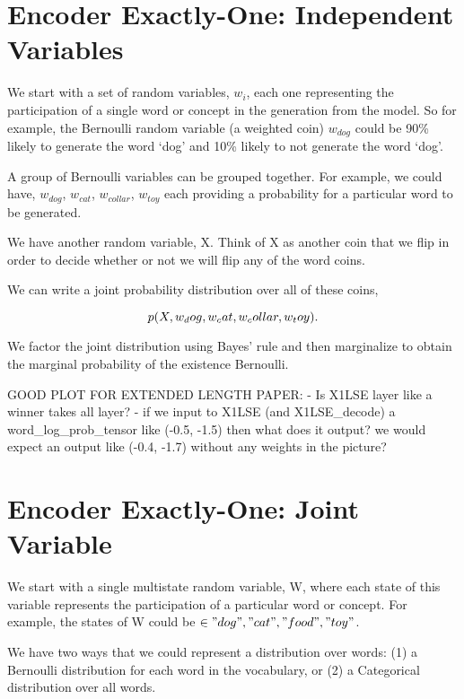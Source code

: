 \section{Encoder Exactly-One: Independent Variables}

We start with a set of random variables, $w_i$, each one representing the participation of a single word or concept in the generation from the model.  So for example, the Bernoulli random variable (a weighted coin) $w_{dog}$ could be 90\% likely to generate the word `dog' and 10\% likely to not generate the word `dog'.

A group of Bernoulli variables can be grouped together.  For example, we could have, $w_{dog}$, $w_{cat}$, $w_{collar}$, $w_{toy}$ each providing a probability for a particular word to be generated.

We have another random variable, X. Think of X as another coin that we flip in order to decide whether or not we will flip any of the word coins.

We can write a joint probability distribution over all of these coins,

\begin{equation}
    p(X, w_dog, w_cat, w_collar, w_toy). \\
\end{equation}




We factor the joint distribution using Bayes' rule and then marginalize to obtain the marginal probability of the existence Bernoulli.

GOOD PLOT FOR EXTENDED LENGTH PAPER:
- Is X1LSE layer like a winner takes all layer?  - if we input to X1LSE (and X1LSE_decode) a word_log_prob_tensor like (-0.5, -1.5) 
then what does it output?  we would expect an output like (-0.4, -1.7) without any weights in the picture?


\section{Encoder Exactly-One: Joint Variable}

We start with a single multistate random variable, W, where each state of this variable represents the participation of a particular word or concept.  For example, the states of W could be $\in "dog", "cat", "food", "toy"$.


We have two ways that we could represent a distribution over words: (1) a Bernoulli distribution for each word in the vocabulary, or (2) a Categorical distribution over all words.


